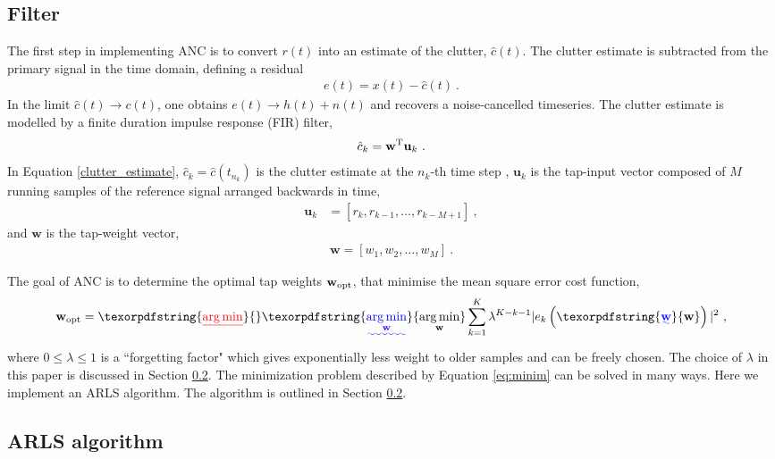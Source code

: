 \documentclass[pra,superscriptaddress,reprint,amsmath,amssymb,nofootinbib]{revtex4-2}
\DeclareMathOperator*{\argminA}{arg\,min} %
\providecommand{\DIFaddtex}[1]{{\protect\color{blue}\uwave{#1}}} %
\providecommand{\DIFdeltex}[1]{{\protect\color{red}\sout{#1}}}                      %
\providecommand{\DIFaddbegin}{} %
\providecommand{\DIFaddend}{} %
\providecommand{\DIFdelbegin}{} %
\providecommand{\DIFdelend}{} %
\providecommand{\DIFadd}[1]{\texorpdfstring{\DIFaddtex{#1}}{#1}} %
\providecommand{\DIFdel}[1]{\texorpdfstring{\DIFdeltex{#1}}{}} %
\newcommand{\DIFscaledelfig}{0.5}
\newlength{\DIFdelgraphicswidth} %
\newlength{\DIFdelgraphicsheight} %
\newcommand{\DIFaddincludegraphics}[2][]{{\color{blue}\fbox{\DIFOincludegraphics[#1]{#2}}}} %
\newcommand{\DIFdelincludegraphics}[2][]{%
\sbox{\DIFdelgraphicsbox}{\DIFOincludegraphics[#1]{#2}}%
\settoboxwidth{\DIFdelgraphicswidth}{\DIFdelgraphicsbox} %
\settoboxtotalheight{\DIFdelgraphicsheight}{\DIFdelgraphicsbox} %
\scalebox{\DIFscaledelfig}{%
\parbox[b]{\DIFdelgraphicswidth}{\usebox{\DIFdelgraphicsbox}\\[-\baselineskip] \rule{\DIFdelgraphicswidth}{0em}}\llap{\resizebox{\DIFdelgraphicswidth}{\DIFdelgraphicsheight}{%
\setlength{\unitlength}{\DIFdelgraphicswidth}%
\begin{picture}(1,1)%
\thicklines\linethickness{2pt} %
{\color[rgb]{1,0,0}\put(0,0){\framebox(1,1){}}}%
{\color[rgb]{1,0,0}\put(0,0){\line( 1,1){1}}}%
{\color[rgb]{1,0,0}\put(0,1){\line(1,-1){1}}}%
\end{picture}%
}\hspace*{3pt}}} %
} %
\DeclareRobustCommand{\DIFaddbegin}{\DIFOaddbegin \let\includegraphics\DIFaddincludegraphics} %
\DeclareRobustCommand{\DIFaddend}{\DIFOaddend \let\includegraphics\DIFOincludegraphics} %
\DeclareRobustCommand{\DIFdelbegin}{\DIFOdelbegin \let\includegraphics\DIFdelincludegraphics} %
\DeclareRobustCommand{\DIFdelend}{\DIFOaddend \let\includegraphics\DIFOincludegraphics} %
\begin{document}
\subsection{Filter}

The first step in implementing ANC is to convert $r(t)$ into an estimate of the clutter, $\hat{c}(t)$. The clutter estimate is subtracted from the primary signal in the time domain, defining a residual
\begin{eqnarray}
	e(t) = x(t) - \hat{c}(t) \ .\label{eq:error_estimate}
\end{eqnarray}
In the limit $\hat{c}(t) \to c(t)$, one obtains	$e(t) \to h(t) + n(t)$ and recovers a noise-cancelled timeseries. The clutter estimate is modelled by a finite duration impulse response (FIR) filter,
\begin{eqnarray}
	\hat{c}_k = \mathbf{w}^{\rm T}\mathbf{u}_k \ . \label{clutter_estimate}
\end{eqnarray}
In Equation \eqref{clutter_estimate}, ${\hat c}_k = {\hat c}(t_{n_k})$ is the clutter estimate at the $n_k$-th time step , $\mathbf{u}_k$ is the tap-input vector composed of $M$ running samples of the reference signal arranged backwards in time,
 \begin{eqnarray}
 	\mathbf{u}_k &= [r_k, r_{k-1}, \dots, r_{k-M+1}] \ ,
 \end{eqnarray}
and $\mathbf{w}$ is the tap-weight vector,
 \begin{eqnarray}
	\mathbf{w} = [w_1, w_{2}, \dots, w_{M}] \ .
\end{eqnarray}

The goal of ANC is to determine the optimal tap weights $\mathbf{w}_{\rm opt}$, that minimise the mean square error cost function,
\begin{eqnarray}
\mathbf{w}_{\rm opt} =\DIFdelbegin \DIFdel{\arg \min }\DIFdelend \DIFaddbegin \DIFadd{\argminA_{\mathbf{w}}  }\DIFaddend \sum_{k=1}^{K} \lambda^{K-k-1} |e_k \DIFaddbegin \left(\DIFadd{\mathbf{w}}\right)\DIFaddend |^2 \ , \label{eq:minim}
\end{eqnarray}
where $0 \leq \lambda \leq 1$ is a ``forgetting factor" which gives exponentially less weight to older samples and can be freely chosen. The choice of $\lambda$ in this paper is discussed in Section \ref{sec:ARLS}. The minimization problem described by Equation \eqref{eq:minim} can be solved in many ways. Here we implement an ARLS algorithm. The algorithm is outlined in Section \ref{sec:ARLS}.

\subsection{ARLS algorithm}
\label{sec:ARLS}
\end{document}

